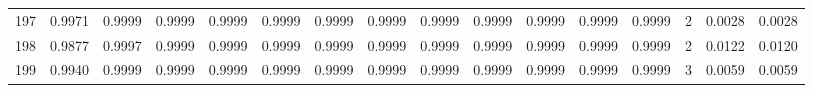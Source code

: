 \begin{tabular}{lrrrrrrrrrrrrrrr}
197 &      0.9971 &  0.9999 &  0.9999 &  0.9999 &  0.9999 &  0.9999 &  0.9999 &  0.9999 &  0.9999 &  0.9999 &   0.9999 &     0.9999 &      2 &                    0.0028 &                     0.0028 \\
198 &      0.9877 &  0.9997 &  0.9999 &  0.9999 &  0.9999 &  0.9999 &  0.9999 &  0.9999 &  0.9999 &  0.9999 &   0.9999 &     0.9999 &      2 &                    0.0122 &                     0.0120 \\
199 &      0.9940 &  0.9999 &  0.9999 &  0.9999 &  0.9999 &  0.9999 &  0.9999 &  0.9999 &  0.9999 &  0.9999 &   0.9999 &     0.9999 &      3 &                    0.0059 &                     0.0059 \\
\bottomrule
\end{tabular}

